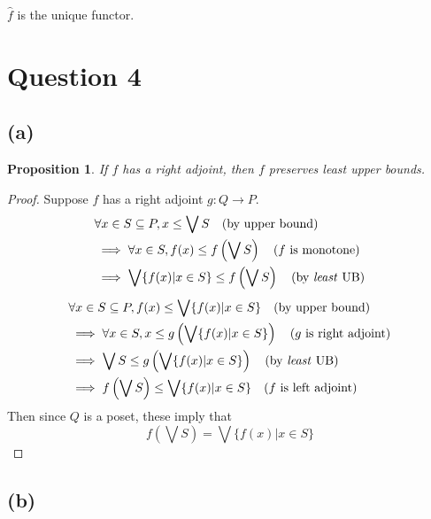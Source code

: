 \documentclass[11pt]{article} %
\newtheorem{proposition}[theorem]{Proposition}
\theoremstyle{definition}
\theoremstyle{definition}
\theoremstyle{definition}
\begin{document}
$\hat{f}$ is the unique functor.

\clearpage
\section*{Question 4}
\addtocounter{section}{1}
\subsection{(a)}
\begin{proposition}
  If $f$ has a right adjoint, then $f$ preserves least upper bounds.
\end{proposition}
\begin{proof}
Suppose $f$ has a right adjoint $g: Q\rightarrow P$.
\begin{equation}
\begin{aligned}
  &\forall x\in S\subseteq P, x \leq \bigvee S \quad\text{(by upper bound)}\\
  &\implies \forall x\in S, f(x) \leq f\left(\bigvee S\right) \quad\text{($f$ is monotone)}\\
  &\implies \bigvee\{f(x) | x\in S\} \leq f\left(\bigvee S\right) \quad\text{(by \textit{least} UB)}
\end{aligned}
\end{equation}
\begin{equation}
\begin{aligned}
  &\forall x\in S\subseteq P, f(x) \leq \bigvee\{f(x) | x\in S\} \quad\text{(by upper bound)}\\
  &\implies \forall x\in S, x \leq g\left(\bigvee\{f(x) | x\in S\}\right) \quad\text{($g$ is right adjoint)}\\
  &\implies \bigvee S \leq g\left(\bigvee\{f(x) | x\in S\}\right) \quad\text{(by \textit{least} UB)}\\
  &\implies f\left(\bigvee S\right) \leq \bigvee\{f(x) | x\in S\} \quad\text{($f$ is left adjoint)}
\end{aligned}
\end{equation}
Then since $Q$ is a poset, these imply that
\[f\left(\bigvee S\right) = \bigvee\{f(x) | x\in S\}\]
  
\end{proof}
\subsection{(b)}
\end{document}
